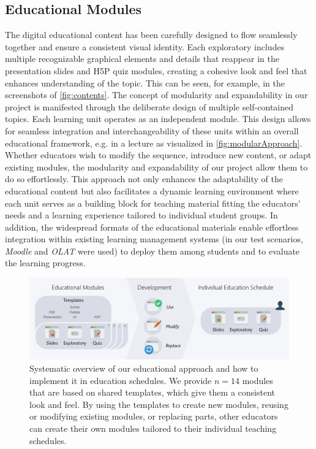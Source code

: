 \subsection{Educational Modules} %
The digital educational content has been carefully designed to flow seamlessly together and ensure a consistent visual identity. Each exploratory includes multiple recognizable graphical elements and details that reappear in the presentation slides and H5P quiz modules, creating a cohesive look and feel that enhances understanding of the topic. This can be seen, for example, in the screenshots of \autoref{fig:contents}.
The concept of modularity and expandability in our project is manifested through the deliberate design of multiple self-contained topics. Each learning unit operates as an independent module. This design allows for seamless integration and interchangeability of these units within an overall educational framework, e.g. in a lecture as visualized in \autoref{fig:modularApproach}. Whether educators wish to modify the sequence, introduce new content, or adapt existing modules, the modularity and expandability of our project allow them to do so effortlessly. This approach not only enhances the adaptability of the educational content but also facilitates a dynamic learning environment where each unit serves as a building block for teaching material fitting the educators' needs and a learning experience tailored to individual student groups. In addition, the widespread formats of the educational materials enable effortless integration within existing learning management systems (in our test scenarios, \emph{Moodle} and \emph{OLAT} were used) to deploy them among students and to evaluate the learning progress.
\begin{figure}[h!bt]
	\centering
	\includegraphics[width=\linewidth]{pictures/modularApproach.png}
	\captionsetup{labelfont=bf,textfont=it}
	\caption{Systematic overview of our educational approach and how to implement it in education schedules. We provide $n=14$ modules that are based on shared templates, which give them a consistent look and feel. By using the templates to create new modules, reusing or modifying existing modules, or replacing parts, other educators can create their own modules tailored to their individual teaching schedules.\label{fig:modularApproach}}
\end{figure}
